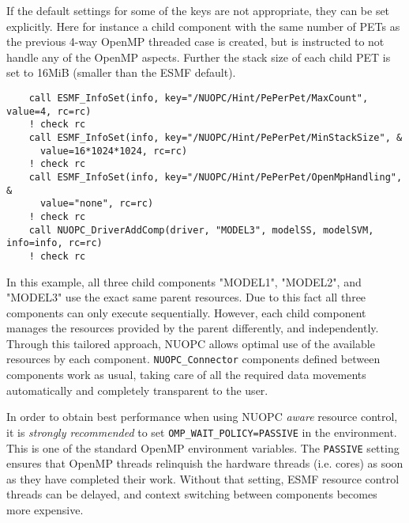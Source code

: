 If the default settings for some of the keys are not appropriate, they can be set explicitly. Here for instance a child component with the same number of PETs as the previous 4-way OpenMP threaded case is created, but is instructed to not handle any of the OpenMP aspects. Further the stack size of each child PET is set to 16MiB (smaller than the ESMF default).

\begin{verbatim}
    call ESMF_InfoSet(info, key="/NUOPC/Hint/PePerPet/MaxCount", value=4, rc=rc)
    ! check rc
    call ESMF_InfoSet(info, key="/NUOPC/Hint/PePerPet/MinStackSize", &
      value=16*1024*1024, rc=rc)
    ! check rc
    call ESMF_InfoSet(info, key="/NUOPC/Hint/PePerPet/OpenMpHandling", &
      value="none", rc=rc)
    ! check rc
    call NUOPC_DriverAddComp(driver, "MODEL3", modelSS, modelSVM, info=info, rc=rc)
    ! check rc
\end{verbatim}

In this example, all three child components "MODEL1", "MODEL2", and "MODEL3" use the exact same parent resources. Due to this fact all three components can only execute sequentially. However, each child component manages the resources provided by the parent differently, and independently. Through this tailored approach, NUOPC allows optimal use of the available resources by each component. {\tt NUOPC\_Connector} components defined between components work as usual, taking care of all the required data movements automatically and completely transparent to the user.

In order to obtain best performance when using NUOPC {\em aware} resource control, it is {\em strongly recommended} to set {\tt OMP\_WAIT\_POLICY=PASSIVE} in the environment. This is one of the standard OpenMP environment variables. The {\tt PASSIVE} setting ensures that OpenMP threads relinquish the hardware threads (i.e. cores) as soon as they have completed their work. Without that setting, ESMF resource control threads can be delayed, and context switching between components becomes more expensive.
